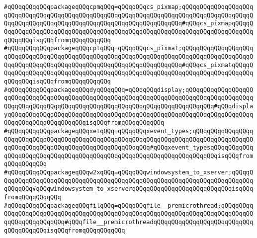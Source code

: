\verb|#qQQqqQQqqQQqpackageqQQqcpmqQQq=qQQqqQQqcs_pixmap;qQQqqQQqqQQqqQQqqQQqqQQqqQQqqQQqqQQqqQQqqQQqqQQqqQQqqQQqqQQqqQQqqQQqqQQqqQQqqQQqqQQqqQQqqQQqqQQqqQQqqQQqqQQqqQQqqQQqqQQqqQQqqQQqqQQqqQQqqQQq#qQQqcs_pixmapqQQqqQQqqQQqqQQqqQQqqQQqqQQqqQQqqQQqqQQqqQQqqQQqqQQqqQQqqQQqqQQqqQQqqQQqqQQqqQQqqQQqisqQQqfromqQQqqQQqqQQq|\newline
\verb|#qQQqqQQqqQQqpackageqQQqcptqQQq=qQQqqQQqcs_pixmat;qQQqqQQqqQQqqQQqqQQqqQQqqQQqqQQqqQQqqQQqqQQqqQQqqQQqqQQqqQQqqQQqqQQqqQQqqQQqqQQqqQQqqQQqqQQqqQQqqQQqqQQqqQQqqQQqqQQqqQQqqQQqqQQqqQQqqQQqqQQq#qQQqcs_pixmatqQQqqQQqqQQqqQQqqQQqqQQqqQQqqQQqqQQqqQQqqQQqqQQqqQQqqQQqqQQqqQQqqQQqqQQqqQQqqQQqqQQqisqQQqfromqQQqqQQqqQQq|\newline
\verb|#qQQqqQQqqQQqpackageqQQqdyqQQqqQQq=qQQqqQQqdisplay;qQQqqQQqqQQqqQQqqQQqqQQqqQQqqQQqqQQqqQQqqQQqqQQqqQQqqQQqqQQqqQQqqQQqqQQqqQQqqQQqqQQqqQQqqQQqqQQqqQQqqQQqqQQqqQQqqQQqqQQqqQQqqQQqqQQqqQQqqQQqqQQqqQQq#qQQqdisplayqQQqqQQqqQQqqQQqqQQqqQQqqQQqqQQqqQQqqQQqqQQqqQQqqQQqqQQqqQQqqQQqqQQqqQQqqQQqqQQqqQQqqQQqqQQqisqQQqfromqQQqqQQqqQQq|\newline
\verb|#qQQqqQQqqQQqpackageqQQqxetqQQq=qQQqqQQqxevent_types;qQQqqQQqqQQqqQQqqQQqqQQqqQQqqQQqqQQqqQQqqQQqqQQqqQQqqQQqqQQqqQQqqQQqqQQqqQQqqQQqqQQqqQQqqQQqqQQqqQQqqQQqqQQqqQQqqQQqqQQqqQQqqQQq#qQQqxevent_typesqQQqqQQqqQQqqQQqqQQqqQQqqQQqqQQqqQQqqQQqqQQqqQQqqQQqqQQqqQQqqQQqqQQqqQQqisqQQqfromqQQqqQQqqQQq|\newline
\verb|#qQQqqQQqqQQqpackageqQQqw2xqQQq=qQQqqQQqwindowsystem_to_xserver;qQQqqQQqqQQqqQQqqQQqqQQqqQQqqQQqqQQqqQQqqQQqqQQqqQQqqQQqqQQqqQQqqQQqqQQqqQQqqQQqqQQq#qQQqwindowsystem_to_xserverqQQqqQQqqQQqqQQqqQQqqQQqqQQqisqQQqfromqQQqqQQqqQQq|\newline
\verb|#qQQqqQQqqQQqpackageqQQqfilqQQq=qQQqqQQqfile__premicrothread;qQQqqQQqqQQqqQQqqQQqqQQqqQQqqQQqqQQqqQQqqQQqqQQqqQQqqQQqqQQqqQQqqQQqqQQqqQQqqQQqqQQqqQQqqQQqqQQq#qQQqfile__premicrothreadqQQqqQQqqQQqqQQqqQQqqQQqqQQqqQQqqQQqqQQqisqQQqfromqQQqqQQqqQQq|\newline
